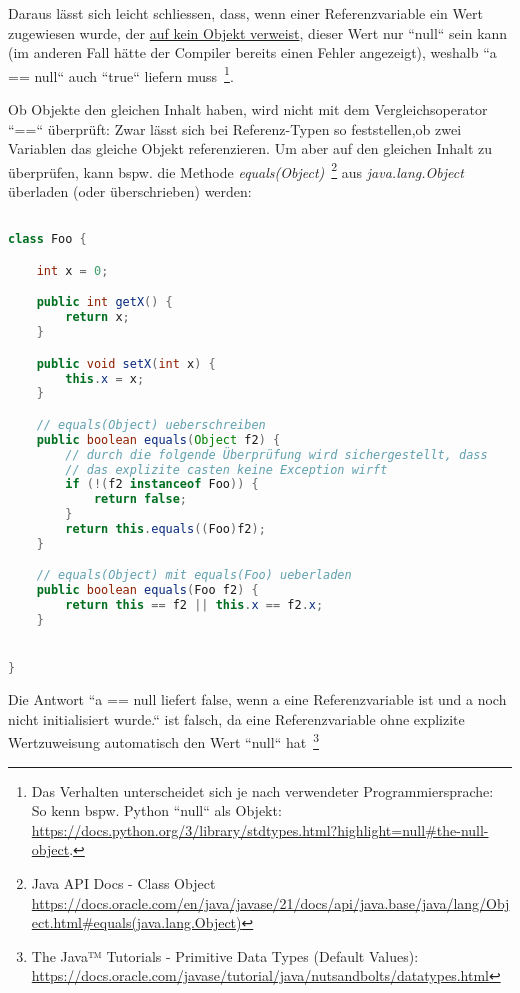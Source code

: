 Daraus lässt sich leicht schliessen, dass, wenn einer Referenzvariable ein Wert zugewiesen wurde, der \underline{auf kein Objekt verweist},
dieser Wert nur ``null`` sein kann (im anderen Fall hätte der Compiler bereits einen Fehler angezeigt), weshalb ``a == null`` auch
``true`` liefern muss~\footnote{
Das Verhalten unterscheidet sich je nach verwendeter Programmiersprache: So kenn bspw. Python ``null`` als Objekt: \url{https://docs.python.org/3/library/stdtypes.html?highlight=null#the-null-object}.
}.

Ob Objekte den gleichen Inhalt haben, wird nicht mit dem Vergleichsoperator ``==`` überprüft: Zwar lässt sich bei Referenz-Typen
so feststellen,ob zwei Variablen das gleiche Objekt referenzieren. Um aber auf den gleichen Inhalt zu überprüfen, kann
bspw. die Methode \textit{equals(Object)}~\footnote{
    Java API Docs - Class Object \url{https://docs.oracle.com/en/java/javase/21/docs/api/java.base/java/lang/Object.html#equals(java.lang.Object)}
} aus \textit{java.lang.Object} überladen (oder überschrieben) werden:


\begin{lstlisting}[language=java]

class Foo {

    int x = 0;

    public int getX() {
        return x;
    }

    public void setX(int x) {
        this.x = x;
    }

    // equals(Object) ueberschreiben
    public boolean equals(Object f2) {
        // durch die folgende Überprüfung wird sichergestellt, dass
        // das explizite casten keine Exception wirft
        if (!(f2 instanceof Foo)) {
            return false;
        }
        return this.equals((Foo)f2);
    }

    // equals(Object) mit equals(Foo) ueberladen
    public boolean equals(Foo f2) {
        return this == f2 || this.x == f2.x;
    }


}
\end{lstlisting}

Die Antwort ``a == null liefert false, wenn a eine Referenzvariable ist und a noch nicht initialisiert wurde.`` ist falsch,
da eine Referenzvariable ohne explizite Wertzuweisung automatisch den Wert ``null`` hat~\footnote{The Java™ Tutorials - Primitive Data Types (Default Values): \url{https://docs.oracle.com/javase/tutorial/java/nutsandbolts/datatypes.html}}